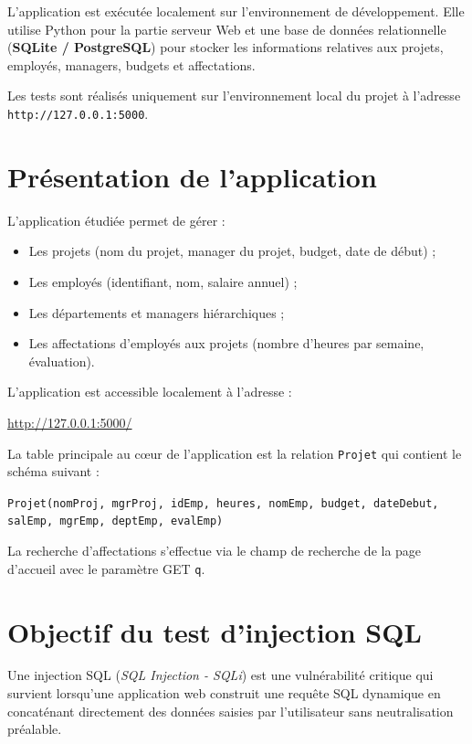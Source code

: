 \documentclass[12pt,a4paper]{article}
\begin{document}
L'application est exécutée localement sur l'environnement de développement. Elle utilise Python pour la partie serveur Web et une base de données relationnelle (\textbf{SQLite / PostgreSQL}) pour stocker les informations relatives aux projets, employés, managers, budgets et affectations.

Les tests sont réalisés uniquement sur l'environnement local du projet à l'adresse \texttt{http://127.0.0.1:5000}.

\section{Présentation de l'application}
L'application étudiée permet de gérer :
\begin{itemize}
    \item Les projets (nom du projet, manager du projet, budget, date de début) ;
    \item Les employés (identifiant, nom, salaire annuel) ;
    \item Les départements et managers hiérarchiques ;
    \item Les affectations d'employés aux projets (nombre d'heures par semaine, évaluation).
\end{itemize}

L'application est accessible localement à l'adresse :
\begin{center}
    \url{http://127.0.0.1:5000/}
\end{center}

La table principale au cœur de l'application est la relation \texttt{Projet} qui contient le schéma suivant :
\begin{center}
\small
\texttt{Projet(nomProj, mgrProj, idEmp, heures, nomEmp, budget, dateDebut, salEmp, mgrEmp, deptEmp, evalEmp)}
\end{center}

La recherche d'affectations s'effectue via le champ de recherche de la page d'accueil avec le paramètre GET \texttt{q}.

\section{Objectif du test d'injection SQL}
Une injection SQL (\textit{SQL Injection - SQLi}) est une vulnérabilité critique qui survient lorsqu'une application web construit une requête SQL dynamique en concaténant directement des données saisies par l'utilisateur sans neutralisation préalable.
\end{document}
